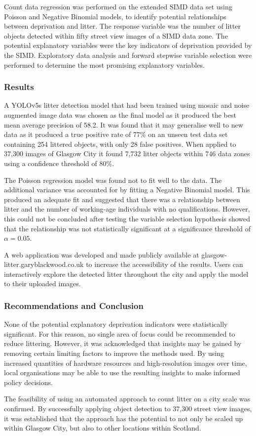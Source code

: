 \documentclass[10pt]{article}
\begin{document}
Count data regression was performed on the extended SIMD data set using Poisson and Negative Binomial models, to identify potential relationships between deprivation and litter. The response variable was the number of litter objects detected within fifty street view images of a SIMD data zone. The potential explanatory variables were the key indicators of deprivation provided by the SIMD. Exploratory data analysis and forward stepwise variable selection were performed to determine the most promising explanatory variables.

\subsubsection*{Results}

A YOLOv5s litter detection model that had been trained using mosaic and noise augmented image data was chosen as the final model as it produced the best mean average precision of 58.2. It was found that it may generalise well to new data as it produced a true positive rate of 77\% on an unseen test data set containing 254 littered objects, with only 28 false positives. When applied to 37,300 images of Glasgow City it found 7,732 litter objects within 746 data zones using a confidence threshold of 80\%.

The Poisson regression model was found not to fit well to the data. The additional variance was accounted for by fitting a Negative Binomial model. This produced an adequate fit and suggested that there was a relationship between litter and the number of working-age individuals with no qualifications. However, this could not be concluded after testing the variable selection hypothesis showed that the relationship was not statistically significant at a significance threshold of $\alpha = 0.05$.

A web application was developed and made publicly available at glasgow-litter.garyblackwood.co.uk to increase the accessibility of the results. Users can interactively explore the detected litter throughout the city and apply the model to their uploaded images.

\subsubsection*{Recommendations and Conclusion}

None of the potential explanatory deprivation indicators were statistically significant. For this reason, no single area of focus could be recommended to reduce littering. However, it was acknowledged that insights may be gained by removing certain limiting factors to improve the methods used. By using increased quantities of hardware resources and high-resolution images over time, local organisations may be able to use the resulting insights to make informed policy decisions.

The feasibility of using an automated approach to count litter on a city scale was confirmed. By successfully applying object detection to 37,300 street view images, it was established that the approach has the potential to not only be scaled up within Glasgow City, but also to other locations within Scotland.
    
\end{document}
